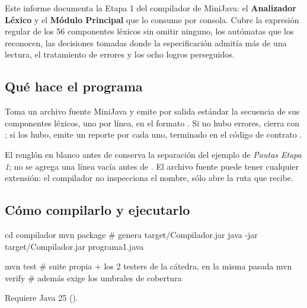 \documentclass[11pt,a4paper]{article}
\begin{document}
Este informe documenta la Etapa 1 del compilador de MiniJava: el \textbf{Analizador Léxico} y el
\textbf{Módulo Principal} que lo consume por consola. Cubre la expresión regular de los 56
componentes léxicos sin omitir ninguno, los autómatas que los reconocen, las decisiones tomadas
donde la especificación admitía más de una lectura, el tratamiento de errores y los ocho logros
perseguidos.

\subsection{Qué hace el programa}

Toma un archivo fuente MiniJava y emite por salida estándar la secuencia de sus componentes léxicos,
uno por línea, en el formato . Si no hubo errores, cierra con
\lex{[SinErrores]}; si los hubo, emite un reporte por cada uno, terminado en el código de contrato
.

\begin{codigoLlano}
$ java -jar Compilador.jar programa1.java
(litString,"hola",1)
(idMV,v1,2)
(op+,+,2)
(idMV,chau,2)
(pr_if,if,3)
(pr_class,class,3)
(llaveC,},3)
(EOF,$,3)

[SinErrores]
\end{codigoLlano}

El renglón en blanco antes de \lex{[SinErrores]} conserva la separación del ejemplo de
\emph{Pautas Etapa 1}; no se agrega una línea vacía antes de . El archivo fuente puede
tener cualquier extensión: el compilador no inspecciona el nombre, sólo abre la ruta que recibe.

\subsection{Cómo compilarlo y ejecutarlo}

\begin{codigoLlano}
cd compilador
mvn package                                   # genera target/Compilador.jar
java -jar target/Compilador.jar programa1.java

mvn test        # suite propia + los 2 testers de la cátedra, en la misma pasada
mvn verify      # además exige los umbrales de cobertura
\end{codigoLlano}

Requiere Java 25 ().

\end{document}
